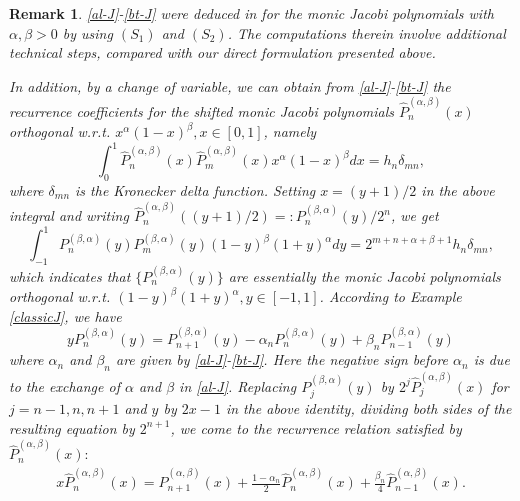 \documentclass[12pt,a4paper]{article}    %
\newtheorem{remark}{Remark}
\numberwithin{equation}{section}
\begin{document}
\begin{remark}
\eqref{al-J}-\eqref{bt-J} were deduced in \cite{ChenIsmail05} for the monic Jacobi polynomials with $\alpha,\beta>0$ by using $(S_1)$ and $(S_2)$. The computations therein involve additional technical steps, compared with our direct formulation presented above.

In addition, by a change of variable, we can obtain from \eqref{al-J}-\eqref{bt-J} the recurrence coefficients for the shifted monic Jacobi polynomials $\widehat{P}_n^{(\alpha,\beta)}(x)$ orthogonal w.r.t. $x^{\alpha}(1-x)^{\beta},x\in[0,1]$, namely
\vspace{-2mm}
\[\int_0^1\widehat{P}_n^{(\alpha,\beta)}(x)\widehat{P}_m^{(\alpha,\beta)}(x)x^{\alpha}(1-x)^{\beta}dx= h_n\delta_{mn},\]
where $\delta_{mn}$ is the Kronecker delta function. Setting $x=(y+1)/2$ in the above integral and writing $\widehat{P}_n^{(\alpha,\beta)}((y+1)/2)=:P_n^{(\beta,\alpha)}(y)/2^n$, we get
\[\int_{-1}^1P_n^{(\beta,\alpha)}(y)P_m^{(\beta,\alpha)}(y)(1-y)^{\beta}(1+y)^{\alpha}dy=2^{m+n+\alpha+\beta+1}h_n\delta_{mn},\]
which indicates that $\{P_n^{(\beta,\alpha)}(y)\}$ are essentially the monic Jacobi polynomials orthogonal w.r.t. $(1-y)^{\beta}(1+y)^{\alpha}, y\in[-1,1]$. According to Example \ref{classicJ}, we have
\[yP_n^{(\beta,\alpha)}(y)=P_{n+1}^{(\beta,\alpha)}(y)-\alpha_nP_n^{(\beta,\alpha)}(y)+\beta_nP_{n-1}^{(\beta,\alpha)}(y)\]
where $\alpha_n$ and $\beta_n$ are given by \eqref{al-J}-\eqref{bt-J}. Here the negative sign before $\alpha_n$ is due to the exchange of $\alpha$ and $\beta$ in \eqref{al-J}. Replacing $P_j^{(\beta,\alpha)}(y)$ by $2^j\widehat{P}_j^{(\alpha,\beta)}(x)$ for $j=n-1,n,n+1$ and $y$ by $2x-1$ in the above identity, dividing both sides of the resulting equation by $2^{n+1}$, we come to the recurrence relation satisfied by $\widehat{P}_n^{(\alpha,\beta)}(x):$
\begin{align}\label{cJ-sJ-3r}
x\widehat{P}_n^{(\alpha,\beta)}(x)=\widehat{P}_{n+1}^{(\alpha,\beta)}(x)+\frac{1-\alpha_n}{2}\widehat{P}_n^{(\alpha,\beta)}(x)+\frac{\beta_n}{4}\widehat{P}_{n-1}^{(\alpha,\beta)}(x).
\end{align}
\end{remark}
\end{document}
